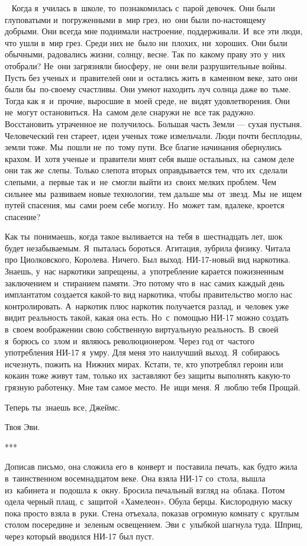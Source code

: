 ~
Когда я~училась в~школе, то~познакомилась с~парой девочек.
Они были глуповатыми и~погруженными в~мир грез, но~они были по-настоящему добрыми.
Они всегда мне поднимали настроение, поддерживали.
И~все эти люди, что ушли в~мир грез.
Среди них не~было ни~плохих, ни~хороших.
Они были обычными, радовались жизни, солнцу, весне.
Так по~какому праву это у~них отобрали? Не~они загрязняли биосферу, не~они вели разрушительные войны.
Пусть без ученых и~правителей они и~остались жить в~каменном веке, зато они были бы~по-своему счастливы.
Они умеют находить луч солнца даже во~тьме.
Тогда как я~и~прочие, выросшие в~моей среде, не~видят удовлетворения.
Они не~могут остановиться.
На~самом деле снаружи не~все так радужно.
Восстановить утраченное не~получилось.
Большая часть Земли --- сухая пустыня.
Человеческий ген стареет, идеи ученых тоже измельчали.
Люди почти бесплодны, земли тоже.
Мы~пошли не~по~тому пути.
Все благие начинания обернулись крахом.
И~хотя ученые и~правители мнят себя выше остальных, на~самом деле они так же~слепы.
Только слепота вторых оправдывается тем, что их~сделали слепыми, а~первые так и~не~смогли выйти из~своих мелких проблем.
Чем сильнее мы~развиваем новые технологии, тем дальше мы~от~звезд.
Мы~не~ищем путей спасения, мы~сами роем себе могилу.
Но~может там, вдалеке, кроется спасение?
 
Как ты~понимаешь, когда такое выливается на~тебя в~шестнадцать лет, шок будет незабываемым.
Я~пыталась бороться.
Агитация, зубрила физику.
Читала про Циолковского, Королева.
Ничего.
Был выход.
НИ-17-новый вид наркотика.
Знаешь, у~нас наркотики запрещены, а~употребление карается пожизненным заключением и~стиранием памяти.
Это потому что в~нас самих каждый день имплантатом создается какой-то вид наркотика, чтобы правительство могло нас контролировать.
А~наркотик плюс наркотик получается разлад, и~человек уже видит реальность такой, какая она есть.
Но~с~помощью НИ-17 можно создать в~своем воображении свою собственную виртуальную реальность.
В~своей я~борюсь со~злом и~являюсь революционером.
Через год от~частого употребления НИ-17 я~умру.
Для меня это наилучший выход.
Я~собираюсь исчезнуть, пожить на~Нижних мирах.
Кстати, те, кто употреблял героин или кокаин тоже живут там, только их~заставляют без защиты выполнять какую-то грязную работенку.
Мне там самое место.
Не~ищи меня.
Я~люблю тебя Прощай.
 
Теперь ты~знаешь все, Джеймс.
 
Твоя Эви.
 
\begin{center}
	***
\end{center}
 
Дописав письмо, она сложила его в~конверт и~поставила печать, как будто жила в~таинственном восемнадцатом веке.
Она взяла НИ-17 со~стола, вышла из~кабинета и~подошла к~окну.
Бросила печальный взгляд на~облака.
Потом одела черный плащ, с~защитой «Хамелеон».
Обула берцы.
Кислородную маску пока просто взяла в~руки.
Стена отъехала, показав огромную комнату с~круглым столом посередине и~зеленым освещением.
Эви с~улыбкой шагнула туда.
Шприц, через который вводился НИ-17 был пуст.

